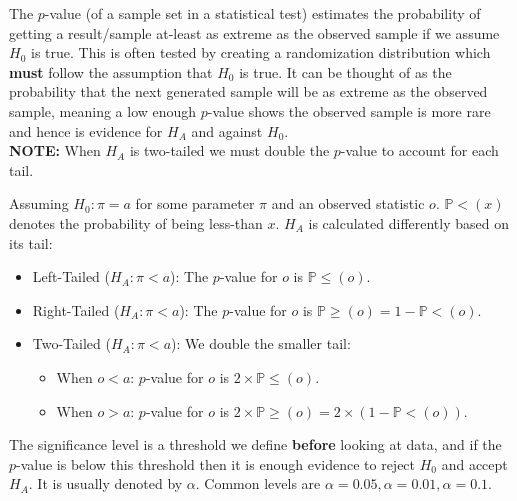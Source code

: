 \documentclass[12pt]{article}
\begin{document}
\begin{tcolorbox}[title=$p$-value]
    The $p$-value (of a sample set in a statistical test) estimates the probability of getting a result/sample at-least as extreme as the observed sample if we assume $H_0$ is true. This is often tested by creating a randomization distribution which \textbf{must} follow the assumption that $H_0$ is true. It can be thought of as the probability that the next generated sample will be as extreme as the observed sample, meaning a low enough $p$-value shows the observed sample is more rare and hence is evidence for $H_A$ and against $H_0$.\\
    \textbf{NOTE:} When $H_A$ is two-tailed we must double the $p$-value to account for each tail.

    \begin{tcolorbox}[title=Computing $p$-values]
        Assuming $H_0 : \pi=a$ for some parameter $\pi$ and an observed statistic $o$. $\mathbb{P}< (x)$ denotes the probability of being less-than $x$. $H_A$ is calculated differently based on its tail:
        \begin{itemize}
            \item Left-Tailed ($H_A:\pi<a$): The $p$-value for $o$ is $\mathbb{P} \le(o)$.
            \item Right-Tailed ($H_A:\pi<a$): The $p$-value for $o$ is $\mathbb{P} \ge (o) = 1 - \mathbb{P} < (o)$.
            \item Two-Tailed ($H_A:\pi<a$): We double the smaller tail:
            \begin{itemize}
                \item When $o<a$: $p$-value for $o$ is $2\times\mathbb{P}\le (o)$.
                \item When $o>a$: $p$-value for $o$ is $2\times\mathbb{P} \ge (o) = 2\times( 1 - \mathbb{P} < (o))$.
            \end{itemize}
        \end{itemize}
    \end{tcolorbox}
\end{tcolorbox}

\begin{tcolorbox}[title=Significance Level]
    The significance level is a threshold we define \textbf{before} looking at data, and if the $p$-value is below this threshold then it is enough evidence to reject $H_0$ and accept $H_A$. It is usually denoted by $\alpha$. Common levels are $\alpha=0.05, \alpha=0.01, \alpha=0.1$.
\end{tcolorbox}
\end{document}
